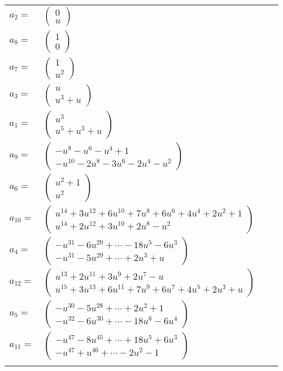 \documentclass[1p]{elsarticle_modified}
\theoremstyle{definition}
\begin{document}
\begin{tabular}{m{7pt} m{180pt} m{7pt} m{180pt} }
\flushright $a_{2}=$&$\begin{pmatrix}0\\u\end{pmatrix}$ \\
\flushright $a_{8}=$&$\begin{pmatrix}1\\0\end{pmatrix}$ \\
\flushright $a_{7}=$&$\begin{pmatrix}1\\u^2\end{pmatrix}$ \\
\flushright $a_{3}=$&$\begin{pmatrix}u\\u^3+u\end{pmatrix}$ \\
\flushright $a_{1}=$&$\begin{pmatrix}u^3\\u^5+u^3+u\end{pmatrix}$ \\
\flushright $a_{9}=$&$\begin{pmatrix}- u^8- u^6- u^4+1\\- u^{10}-2 u^8-3 u^6-2 u^4- u^2\end{pmatrix}$ \\
\flushright $a_{6}=$&$\begin{pmatrix}u^2+1\\u^2\end{pmatrix}$ \\
\flushright $a_{10}=$&$\begin{pmatrix}u^{14}+3 u^{12}+6 u^{10}+7 u^8+6 u^6+4 u^4+2 u^2+1\\u^{14}+2 u^{12}+3 u^{10}+2 u^8- u^2\end{pmatrix}$ \\
\flushright $a_{4}=$&$\begin{pmatrix}- u^{31}-6 u^{29}+\cdots-18 u^5-6 u^3\\- u^{31}-5 u^{29}+\cdots+2 u^3+u\end{pmatrix}$ \\
\flushright $a_{12}=$&$\begin{pmatrix}u^{13}+2 u^{11}+3 u^9+2 u^7- u\\u^{15}+3 u^{13}+6 u^{11}+7 u^9+6 u^7+4 u^5+2 u^3+u\end{pmatrix}$ \\
\flushright $a_{5}=$&$\begin{pmatrix}- u^{30}-5 u^{28}+\cdots+2 u^2+1\\- u^{32}-6 u^{30}+\cdots-18 u^6-6 u^4\end{pmatrix}$ \\
\flushright $a_{11}=$&$\begin{pmatrix}- u^{47}-8 u^{45}+\cdots+18 u^5+6 u^3\\- u^{47}+u^{46}+\cdots-2 u^2-1\end{pmatrix}$\\&\end{tabular}
\end{document}
